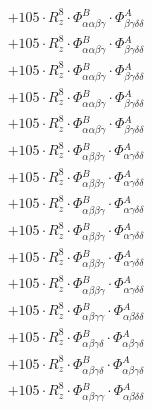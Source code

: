 \documentclass{article}
\begin{document}
\begin{subequations}
\begin{gather}
\begin{array}{c}
 \\[0.2em] 		 + 105 \cdot R_{z}^{8} \cdot \Phi{}^{B}_{\alpha{}\alpha{}\beta{}\gamma{}} \cdot \Phi{}^{A}_{\beta{}\gamma{}\delta{}\delta{}} 
 \\[0.2em] 		 + 105 \cdot R_{z}^{8} \cdot \Phi{}^{B}_{\alpha{}\alpha{}\beta{}\gamma{}} \cdot \Phi{}^{A}_{\beta{}\gamma{}\delta{}\delta{}} 
 \\[0.2em] 		 + 105 \cdot R_{z}^{8} \cdot \Phi{}^{B}_{\alpha{}\alpha{}\beta{}\gamma{}} \cdot \Phi{}^{A}_{\beta{}\gamma{}\delta{}\delta{}} 
 \\[0.2em] 		 + 105 \cdot R_{z}^{8} \cdot \Phi{}^{B}_{\alpha{}\alpha{}\beta{}\gamma{}} \cdot \Phi{}^{A}_{\beta{}\gamma{}\delta{}\delta{}} 
 \\[0.2em] 		 + 105 \cdot R_{z}^{8} \cdot \Phi{}^{B}_{\alpha{}\alpha{}\beta{}\gamma{}} \cdot \Phi{}^{A}_{\beta{}\gamma{}\delta{}\delta{}} 
 \\[0.2em] 		 + 105 \cdot R_{z}^{8} \cdot \Phi{}^{B}_{\alpha{}\beta{}\beta{}\gamma{}} \cdot \Phi{}^{A}_{\alpha{}\gamma{}\delta{}\delta{}} 
 \\[0.2em] 		 + 105 \cdot R_{z}^{8} \cdot \Phi{}^{B}_{\alpha{}\beta{}\beta{}\gamma{}} \cdot \Phi{}^{A}_{\alpha{}\gamma{}\delta{}\delta{}} 
 \\[0.2em] 		 + 105 \cdot R_{z}^{8} \cdot \Phi{}^{B}_{\alpha{}\beta{}\beta{}\gamma{}} \cdot \Phi{}^{A}_{\alpha{}\gamma{}\delta{}\delta{}} 
 \\[0.2em] 		 + 105 \cdot R_{z}^{8} \cdot \Phi{}^{B}_{\alpha{}\beta{}\beta{}\gamma{}} \cdot \Phi{}^{A}_{\alpha{}\gamma{}\delta{}\delta{}} 
 \\[0.2em] 		 + 105 \cdot R_{z}^{8} \cdot \Phi{}^{B}_{\alpha{}\beta{}\beta{}\gamma{}} \cdot \Phi{}^{A}_{\alpha{}\gamma{}\delta{}\delta{}} 
 \\[0.2em] 		 + 105 \cdot R_{z}^{8} \cdot \Phi{}^{B}_{\alpha{}\beta{}\beta{}\gamma{}} \cdot \Phi{}^{A}_{\alpha{}\gamma{}\delta{}\delta{}} 
 \\[0.2em] 		 + 105 \cdot R_{z}^{8} \cdot \Phi{}^{B}_{\alpha{}\beta{}\gamma{}\gamma{}} \cdot \Phi{}^{A}_{\alpha{}\beta{}\delta{}\delta{}} 
 \\[0.2em] 		 + 105 \cdot R_{z}^{8} \cdot \Phi{}^{B}_{\alpha{}\beta{}\gamma{}\delta{}} \cdot \Phi{}^{A}_{\alpha{}\beta{}\gamma{}\delta{}} 
 \\[0.2em] 		 + 105 \cdot R_{z}^{8} \cdot \Phi{}^{B}_{\alpha{}\beta{}\gamma{}\delta{}} \cdot \Phi{}^{A}_{\alpha{}\beta{}\gamma{}\delta{}} 
 \\[0.2em] 		 + 105 \cdot R_{z}^{8} \cdot \Phi{}^{B}_{\alpha{}\beta{}\gamma{}\gamma{}} \cdot \Phi{}^{A}_{\alpha{}\beta{}\delta{}\delta{}} 

\end{array}
\end{gather}
\end{subequations}
\end{document}
